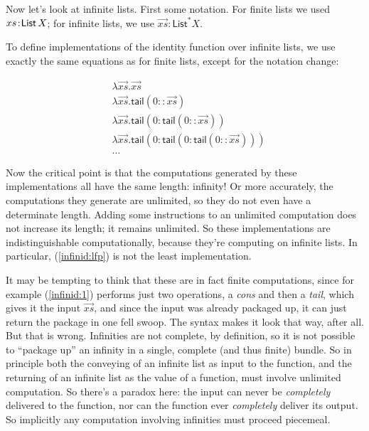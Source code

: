 \documentclass{article}
\begin{document}
Now let's look at infinite lists. First some notation. For finite
lists we used \(xs\hspace{1pt}\mathpunct{:}\hspace{-1pt}\textsf{List}\,X\); for infinite lists, we use
\(\overrightarrow{xs}:\textsf{List}^* X\).

To define implementations of the identity function over infinite
lists, we use exactly the same equations as for finite lists, except
for the notation change:

\begin{align}
  & \lambda \overrightarrow{xs}.\overrightarrow{xs} \label{infinid:lfp} \\
  & \lambda \overrightarrow{xs}.\textsf{tail}(0::\overrightarrow{xs})  \label{infinid:1}\\
  & \lambda \overrightarrow{xs}.\textsf{tail}(0:\textsf{tail}(0::\overrightarrow{xs}))  \label{infinid:2}\\
  & \lambda \overrightarrow{xs}.\textsf{tail}(0:\textsf{tail}(0:\textsf{tail}(0::\overrightarrow{xs}))) \label{infinid:3} \\
  & ... \nonumber
\end{align}

Now the critical point is that the computations generated by these
implementations all have the same length: infinity! Or more
accurately, the computations they generate are unlimited, so they do
not even have a determinate length. Adding some instructions to an
unlimited computation does not increase its length; it remains
unlimited. So these implementations are indistinguishable
computationally, because they're computing on infinite lists. In
particular, (\ref{infinid:lfp}) is not the least implementation.

It may be tempting to think that these are in fact finite
computations, since for example (\ref{infinid:1}) performs just two
operations, a \textit{cons} and then a \textit{tail}, which gives it
the input \(\overrightarrow{xs}\), and since the input was already
packaged up, it can just return the package in one fell swoop. The
syntax makes it look that way, after all. But that is wrong.
Infinities are not complete, by definition, so it is not possible to
``package up'' an infinity in a single, complete (and thus finite)
bundle. So in principle both the conveying of an infinite list as
input to the function, and the returning of an infinite list as the
value of a function, must involve unlimited computation. So there's a
paradox here: the input can never be \textit{completely} delivered to
the function, nor can the function ever \textit{completely} deliver
its output. So implicitly any computation involving infinities must
proceed piecemeal.
\end{document}
